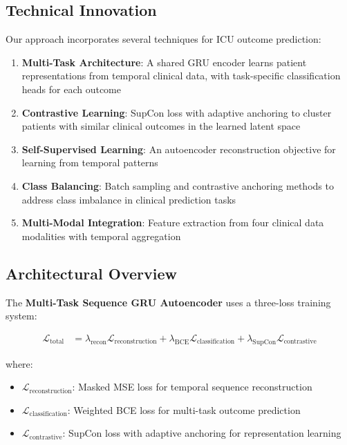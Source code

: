 \documentclass[11pt]{article}
\begin{document}
\subsection{Technical Innovation}

Our approach incorporates several techniques for ICU outcome prediction:

\begin{enumerate}
    \item \textbf{Multi-Task Architecture}: A shared GRU encoder learns patient representations from temporal clinical data, with task-specific classification heads for each outcome
    
    \item \textbf{Contrastive Learning}: SupCon loss with adaptive anchoring to cluster patients with similar clinical outcomes in the learned latent space
    
    \item \textbf{Self-Supervised Learning}: An autoencoder reconstruction objective for learning from temporal patterns
    
    \item \textbf{Class Balancing}: Batch sampling and contrastive anchoring methods to address class imbalance in clinical prediction tasks
    
    \item \textbf{Multi-Modal Integration}: Feature extraction from four clinical data modalities with temporal aggregation
\end{enumerate}

\subsection{Architectural Overview}

The \textbf{Multi-Task Sequence GRU Autoencoder} uses a three-loss training system:

\begin{align}
\mathcal{L}_{\text{total}} &= \lambda_{\text{recon}} \mathcal{L}_{\text{reconstruction}} + \lambda_{\text{BCE}} \mathcal{L}_{\text{classification}} + \lambda_{\text{SupCon}} \mathcal{L}_{\text{contrastive}}
\end{align}

where:
\begin{itemize}
    \item $\mathcal{L}_{\text{reconstruction}}$: Masked MSE loss for temporal sequence reconstruction
    \item $\mathcal{L}_{\text{classification}}$: Weighted BCE loss for multi-task outcome prediction
    \item $\mathcal{L}_{\text{contrastive}}$: SupCon loss with adaptive anchoring for representation learning
\end{itemize}
\end{document}
